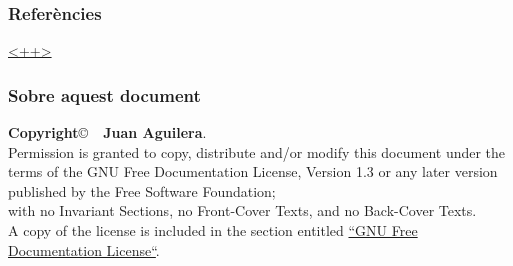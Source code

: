 \documentclass{beamer}
\begin{document}

\begin{frame}
	\frametitle{Referències}
	\begin{thebibliography}{99}
		\bibitem{<++>} \url{<++>}
	\end{thebibliography}
\end{frame}

\begin{frame}
	\frametitle{Sobre aquest document}
\textbf{Copyright}\copyright\ \textbf{\the\year\ Juan Aguilera}.\\
Permission is granted to copy, distribute and/or modify this document under the terms of the GNU Free Documentation License, Version 1.3 or any later version published by the Free Software Foundation;\\
with no Invariant Sections, no Front-Cover Texts, and no Back-Cover Texts.\\
A copy of the license is included in the section entitled \href{http://www.gnu.org/licenses/fdl.html}{``GNU Free Documentation License``}.
\end{frame}
\end{document}
